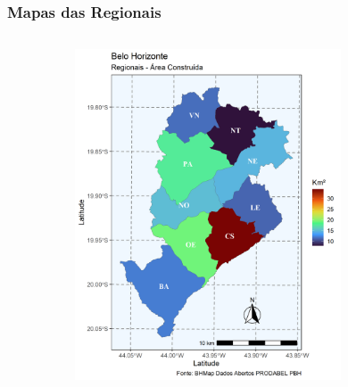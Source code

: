 \begin{frame}
\begin{columns}[t]
\begin{column}{7cm}
\begin{figure}[!htbp]
            \end{figure}
        \end{column}
    \end{columns}
\end{frame}


\begin{frame}

    \frametitle{Mapas das Regionais}

    \begin{columns}[t]
        \begin{column}{7cm}
            \begin{figure}[!htbp]
                \centering
       	    \includegraphics[scale=0.30]{imagens/area_construida.png}
            \end{figure}
        \end{column}
        \begin{column}{7cm}
            \begin{figure}[!htbp]
                \centering

\end{figure}
\end{column}
\end{columns}
\end{frame}
